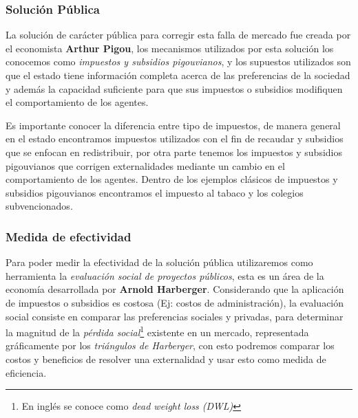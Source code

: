 \subsubsection{Solución Pública}

La solución de carácter pública para corregir esta falla de mercado fue creada por el economista \textbf{Arthur Pigou}, los mecanismos utilizados por esta solución los conocemos como \textit{impuestos y subsidios pigouvianos}, y los supuestos utilizados son que el estado tiene información completa acerca de las preferencias de la sociedad y además la capacidad suficiente para que sus impuestos o subsidios modifiquen el comportamiento de los agentes.

Es importante conocer la diferencia entre tipo de impuestos, de manera general en el estado encontramos impuestos utilizados con el fin de recaudar y subsidios que se enfocan en redistribuir, por otra parte tenemos los impuestos y subsidios pigouvianos que corrigen externalidades mediante un cambio en el comportamiento de los agentes. Dentro de los ejemplos clásicos de impuestos y subsidios pigouvianos encontramos el impuesto al tabaco y los colegios subvencionados.

\subsubsection{Medida de efectividad}

Para poder medir la efectividad de la solución pública utilizaremos como herramienta la \textit{evaluación social de proyectos públicos}, esta es un área de la economía desarrollada por \textbf{Arnold Harberger}. Considerando que la aplicación de impuestos o subsidios es costosa (Ej: costos de administración), la evaluación social consiste en comparar las preferencias sociales y privadas, para determinar la magnitud de la \textit{pérdida social}\footnote{En inglés se conoce como \textit{dead weight loss (DWL)}} existente en un mercado, representada gráficamente por los \textit{triángulos de Harberger}, con esto podremos comparar los costos y beneficios de resolver una externalidad y usar esto como medida de eficiencia. 